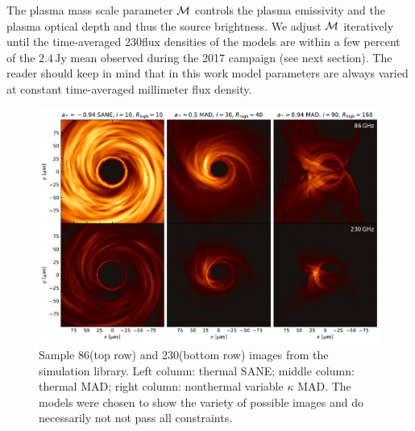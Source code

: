 The plasma mass scale parameter $\mathcal{M}$ controls the plasma emissivity and the plasma optical depth and thus the source brightness.  We adjust $\mathcal{M}$ iteratively until the time-averaged 230\GHz flux densities of the models are within a few percent of the $2.4\,\mathrm{Jy}$ mean observed during the 2017 campaign (see next section).  The reader should keep in mind that in this work model parameters are always varied at constant time-averaged millimeter flux density.



\begin{figure}
  \centering
  \includegraphics[width=\textwidth]{figures/sample_imgs.pdf}
  \caption{Sample 86\GHz (top row) and 230\GHz (bottom row) images from the simulation library.  Left column: thermal SANE; middle column: thermal MAD; right column: nonthermal variable $\kappa$ MAD.  The models were chosen to show the variety of possible images and do necessarily not not pass all constraints.
    }
  \label{fig:sample_imgs}
\end{figure}

